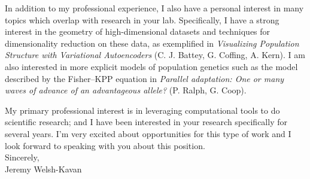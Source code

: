 \documentclass[]{letter}
\begin{document}
In addition to my professional experience, I also have a personal interest in many topics which overlap with research in your lab. Specifically, I have a strong interest in the geometry of high-dimensional datasets and techniques for dimensionality reduction on these data, as exemplified in \textit{Visualizing Population Structure with Variational Autoencoders} (C. J. Battey, G. Coffing, A. Kern). I am also interested in more explicit models of population genetics such as the model described by the Fisher–KPP equation in \textit{Parallel adaptation: One or many waves of advance of an
advantageous allele?} (P. Ralph, G. Coop). 

My primary professional interest is in leveraging computational tools to do scientific research; and I have been interested in your research specifically for several years. I'm very excited about opportunities for this type of work and I look forward to speaking with you about this position. \\

Sincerely, \\
Jeremy Welsh-Kavan
\end{document}
